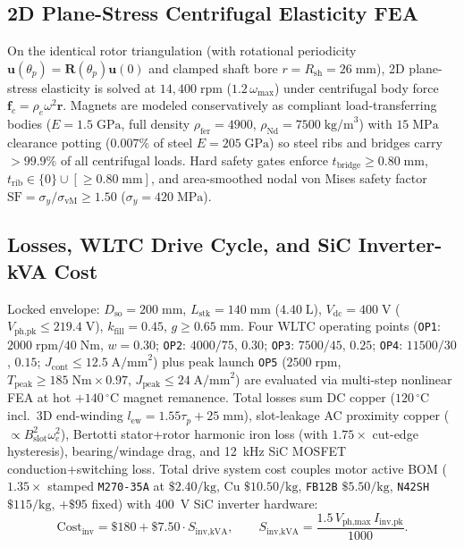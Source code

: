 \documentclass[twocolumn,10pt]{article}
\begin{document}
\subsection{2D Plane-Stress Centrifugal Elasticity FEA}
On the identical rotor triangulation (with rotational periodicity $\mathbf{u}(\theta_p)=\mathbf{R}(\theta_p)\mathbf{u}(0)$ and clamped shaft bore $r=R_{\text{sh}}=26\;\text{mm}$), 2D plane-stress elasticity is solved at $14{,}400\;\text{rpm}$ ($1.2\,\omega_{\max}$) under centrifugal body force $\mathbf{f}_c = \rho_e \omega^2 \mathbf{r}$. Magnets are modeled conservatively as compliant load-transferring bodies ($E=1.5\;\text{GPa}$, full density $\rho_{\text{fer}}=4900$, $\rho_{\text{Nd}}=7500\;\text{kg/m}^3$) with $15\;\text{MPa}$ clearance potting ($0.007\%$ of steel $E=205\;\text{GPa}$) so steel ribs and bridges carry $>99.9\%$ of all centrifugal loads. Hard safety gates enforce $t_{\text{bridge}}\ge 0.80\;\text{mm}$, $t_{\text{rib}}\in\{0\}\cup[\ge 0.80\;\text{mm}]$, and area-smoothed nodal von Mises safety factor $\text{SF}=\sigma_y/\sigma_{\text{vM}}\ge 1.50$ ($\sigma_y=420\;\text{MPa}$).

\subsection{Losses, WLTC Drive Cycle, and SiC Inverter-kVA Cost}
Locked envelope: $D_{\text{so}}=200\;\text{mm}$, $L_{\text{stk}}=140\;\text{mm}$ ($4.40\;\text{L}$), $V_{\text{dc}}=400\;\text{V}$ ($V_{\text{ph,pk}}\le 219.4\;\text{V}$), $k_{\text{fill}}=0.45$, $g\ge 0.65\;\text{mm}$. Four WLTC operating points (\texttt{OP1}: $2000\;\text{rpm}/40\;\text{Nm}$, $w=0.30$; \texttt{OP2}: $4000/75$, $0.30$; \texttt{OP3}: $7500/45$, $0.25$; \texttt{OP4}: $11500/30$, $0.15$; $J_{\text{cont}}\le 12.5\;\text{A/mm}^2$) plus peak launch \texttt{OP5} ($2500\;\text{rpm}$, $T_{\text{peak}}\ge 185\;\text{Nm}\times 0.97$, $J_{\text{peak}}\le 24\;\text{A/mm}^2$) are evaluated via multi-step nonlinear FEA at hot $+140\,^\circ\text{C}$ magnet remanence. Total losses sum DC copper ($120\,^\circ\text{C}$ incl.\ 3D end-winding $l_{\text{ew}}=1.55\tau_p+25\;\text{mm}$), slot-leakage AC proximity copper ($\propto B_{\text{slot}}^2\omega_e^2$), Bertotti stator+rotor harmonic iron loss \citep{bertotti1988general} (with $1.75\times$ cut-edge hysteresis), bearing/windage drag, and 12~kHz SiC MOSFET conduction+switching loss. Total drive system cost couples motor active BOM ($1.35\times$ stamped \texttt{M270-35A} at $\$2.40/\text{kg}$, Cu $\$10.50/\text{kg}$, \texttt{FB12B} $\$5.50/\text{kg}$, \texttt{N42SH} $\$115/\text{kg}$, $+\$95$ fixed) with 400~V SiC inverter hardware:
\begin{equation}
  \text{Cost}_{\text{inv}} = \$180 + \$7.50\cdot S_{\text{inv,kVA}}, \qquad
  S_{\text{inv,kVA}} = \frac{1.5\,V_{\text{ph,max}}\,I_{\text{inv,pk}}}{1000}.
  \label{eq:inv_cost}
\end{equation}
\end{document}
